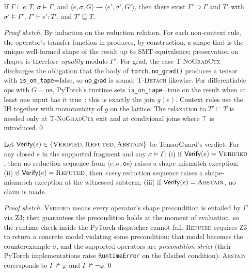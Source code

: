\begin{theorem}
\label{thm:preservation}
If $\Gamma\vdash e:T$, $\sigma\models\Gamma$, and $\langle
e,\sigma,G\rangle\to\langle e',\sigma',G'\rangle$, then there
exist $\Gamma'\supseteq\Gamma$ and $T'$ with
$\sigma'\models\Gamma'$, $\Gamma'\vdash e':T'$, and
$T'\sqsubseteq T$.
\end{theorem}
\begin{proof}[Proof sketch]
By induction on the reduction relation. For each non-context
rule, the operator's transfer function in
 produces, by construction, a shape
that is the unique well-formed shape of the result up to SMT
equivalence; preservation on shapes is therefore
\emph{equality} modulo $\Gamma'$. For grad, the case
\textsc{T-NoGradCtx} discharges the obligation that the body
of \texttt{torch.no\_grad()} produces a tensor with
\texttt{is\_on\_tape}{=}false, so $\mathsf{no\_grad}$ is sound;
\textsc{T-Detach} likewise. For differentiable ops with $G=\mathsf{on}$,
PyTorch's runtime sets \texttt{is\_on\_tape}{=}true on the result
when at least one input has it true~\cite{paszke2019pytorch};
this is exactly the join $g(\bar e)$. Context rules use the IH
together with monotonicity of $g$ on the lattice. The relaxation
to $T'\sqsubseteq T$ is needed only at \textsc{T-NoGradCtx} exit
and at conditional joins where $\top$ is introduced.\qed
\end{proof}

\begin{theorem}
\label{thm:progress}
Let $\mathsf{Verify}(e)\in\{\textsc{Verified},\textsc{Refuted},\textsc{Abstain}\}$
be TensorGuard's verdict. For any closed $e$ in the supported
fragment and any $\sigma\models\Gamma$:
(i) if $\mathsf{Verify}(e)=\textsc{Verified}$, then no reduction
sequence from $\langle e,\sigma,\mathsf{on}\rangle$ raises a
shape-mismatch exception; (ii) if
$\mathsf{Verify}(e)=\textsc{Refuted}$, then \emph{every} reduction
sequence raises a shape-mismatch exception at the witnessed
subterm; (iii) if $\mathsf{Verify}(e)=\textsc{Abstain}$, no claim
is made.
\end{theorem}
\begin{proof}[Proof sketch]
\textsc{Verified} means every operator's shape precondition is
entailed by $\Gamma$ via Z3;  then
guarantees the precondition holds at the moment of evaluation, so
the runtime check inside the PyTorch dispatcher cannot fail.
\textsc{Refuted} requires Z3 to return a concrete model violating
some precondition; that model becomes the counterexample
$\sigma$, and the supported operators are
\emph{precondition-strict} (their PyTorch implementations raise
\texttt{RuntimeError} on the falsified condition).
\textsc{Abstain} corresponds to $\Gamma\not\models\varphi$ and
$\Gamma\not\models\neg\varphi$.\qed
\end{proof}

